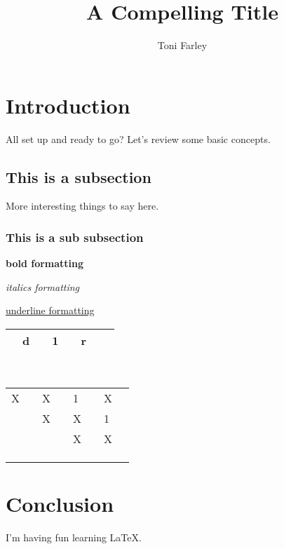 \documentclass{article}
\title{A Compelling Title}
\author{Toni Farley}
\begin{document}
\maketitle

\section{Introduction}

All set up and ready to go? Let's review some basic concepts.

\subsection{This is a subsection}

More interesting things to say here.

\subsubsection{This is a sub subsection}

\textbf{bold formatting}

\emph{italics formatting}

\underline{underline formatting}
\\
\noindent


\noindent
\begin{tabular}{|p{0.3cm}|p{0.2cm} p{0.2cm}|p{0.2cm} p{0.2cm}|p{0.2cm} p{0.2cm}|p{0.1cm}|}
\hline
& d & & 1 & & r & & \\
\hline
\end{tabular} \\
\begin{tabular}{|p{0.2cm} p{0.2cm}|p{0.2cm} p{0.2cm}|p{0.2cm} p{0.2cm}|p{0.2cm} p{0.2cm}|}
X & & X & & 1 & & X & \\
  & & X & & X & & 1 & \\
  & &   & & X & & X & \\
  & &   & &   & &   & \\
  & &   & &   & &   & \\
  & &   & &   & &   & \\
\hline
\end{tabular}



\section{Conclusion}

I'm having fun learning \LaTeX.
\end{document}
